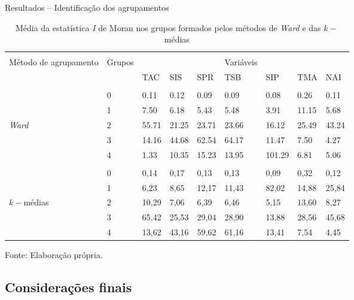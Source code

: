 \documentclass[aspectratio=169]{beamer}
\begin{document}
\begin{frame}{Resultados -- Identificação dos agrupamentos}
\begin{table}[h]
    \caption{Média da estatística \textit{I} de Moran nos grupos formados pelos métodos de \textit{Ward} e das  $k-$médias} \label{mean_I}
    \footnotesize
    \vspace{0.05cm}
    \begin{tabularx}{\textwidth}{LXXXXXXXX}
        \hline \\[-1.9ex]	 
        Método de agrupamento & Grupos & & & & Variáveis \\
        
                      &   & TAC   & SIS   & SPR   & TSB   & SIP  & TMA   & NAI   \\
        \hline \\[-1.9ex]	 
                      & 0 &   0.11 &   0.12 &   0.09 &   0.09 &   0.08 &   0.26 &   0.11 \\
                      & 1 &   7.50 &   6.18 &   5.43 &   5.48 &   3.91 &  11.15 &   5.68 \\
        \textit{Ward} & 2 &  55.71 &  21.25 &  23.71 &  23.66 &  16.12 &  25.49 &  43.24 \\
                      & 3 &  14.16 &  44.68 &  62.54 &  64.17 &  11.47 &   7.50 &   4.27 \\
                      & 4 &   1.33 &  10.35 &  15.23 &  13.95 & 101.29 &   6.81 &   5.06 \\
        \hline \\[-1,9ex]	 
                      & 0 &   0,14 &   0,17 &   0,13 &   0,13 &   0,09  &   0,32 &   0,12 \\
                      & 1 &   6,23 &   8,65 &  12,17 &  11,43 &  82,02  &  14,88 &  25,84 \\
        $k-$médias    & 2 &  10,29 &   7,06 &   6,39 &   6,46 &   5,15  &  13,60 &   8,27 \\
                      & 3 &  65,42 &  25,53 &  29,04 &  28,90 &  13,88  &  28,56 &  45,68 \\
                      & 4 &  13,62 &  43,16 &  59,62 &  61,16 &  13,41  &   7,54 &   4,45 \\
        \hline 
    \end{tabularx} 
\end{table}
\noindent\footnotesize{Fonte: Elaboração própria.  }\\
\end{frame}

\subsection{Considerações finais}
\end{document}
